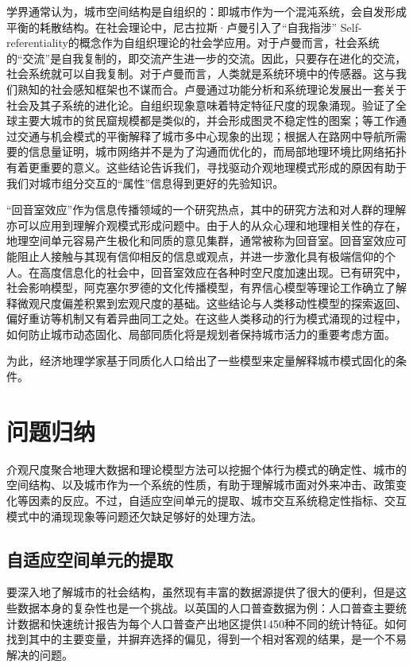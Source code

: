 学界通常认为，城市空间结构是自组织的：即城市作为一个混沌系统，会自发形成平衡的耗散结构。在社会理论中，尼古拉斯·卢曼引入了“自我指涉” Self-referentiality的概念作为自组织理论的社会学应用\cite{luhmann1984soziale}。对于卢曼而言，社会系统的“交流”是自我复制的，即交流产生进一步的交流。因此，只要存在进化的交流，社会系统就可以自我复制。对于卢曼而言，人类就是系统环境中的传感器。这与我们熟知的社会感知框架也不谋而合。卢曼通过功能分析和系统理论发展出一套关于社会及其子系统的进化论。自组织现象意味着特定特征尺度的现象涌现。\cite{friesen2018similar, pelz2019similar}验证了全球主要大城市的贫民窟规模都是类似的，并会形成图灵不稳定性的图案；\cite{louf2013modeling, courtat2011mathematics}等工作通过交通与机会模式的平衡解释了城市多中心现象的出现；\cite{rosvall2005networks}根据人在路网中导航所需要的信息量证明，城市网络并不是为了沟通而优化的，而局部地理环境比网络拓扑有着更重要的意义。这些结论告诉我们，寻找驱动介观地理模式形成的原因有助于我们对城市组分交互的“属性”信息得到更好的先验知识。

“回音室效应”\cite{wang2020public, liu2020modeling}作为信息传播领域的一个研究热点，其中的研究方法和对人群的理解亦可以应用到理解介观模式形成问题中。由于人的从众心理和地理相关性的存在，地理空间单元容易产生极化和同质的意见集群，通常被称为回音室。回音室效应可能阻止人接触与其现有信仰相反的信息或观点，并进一步激化具有极端信仰的个人。在高度信息化的社会中，回音室效应在各种时空尺度加速出现\cite{wang2020public}。已有研究中，社会影响模型\cite{noah2006structural, friedkin2011social, parsegov2016novel}，阿克塞尔罗德的文化传播模型\cite{axelrod1997dissemination}，有界信心模型\cite{deffuant2000mixing}等理论工作确立了解释微观尺度偏差积累到宏观尺度的基础。这些结论与人类移动性模型的探索返回、偏好重访等机制又有着异曲同工之处\cite{song2010modelling, gonzalez2008understanding, brockmann2006scaling}。在这些人类移动的行为模式涌现的过程中，如何防止城市动态固化、局部同质化将是规划者保持城市活力的重要考虑方面。

为此，经济地理学家基于同质化人口给出了一些模型来定量解释城市模式固化的条件。%

\section{问题归纳}

介观尺度聚合地理大数据和理论模型方法可以挖掘个体行为模式的确定性、城市的空间结构、以及城市作为一个系统的性质，有助于理解城市面对外来冲击、政策变化等因素的反应。不过，自适应空间单元的提取、城市交互系统稳定性指标、交互模式中的涌现现象等问题还欠缺足够好的处理方法。

\subsection{自适应空间单元的提取}

要深入地了解城市的社会结构，虽然现有丰富的数据源提供了很大的便利，但是这些数据本身的复杂性也是一个挑战。以英国的人口普查数据为例：人口普查主要统计数据和快速统计报告为每个人口普查产出地区提供1450种不同的统计特征。如何找到其中的主要变量，并摒弃选择的偏见，得到一个相对客观的结果，是一个不易解决的问题。